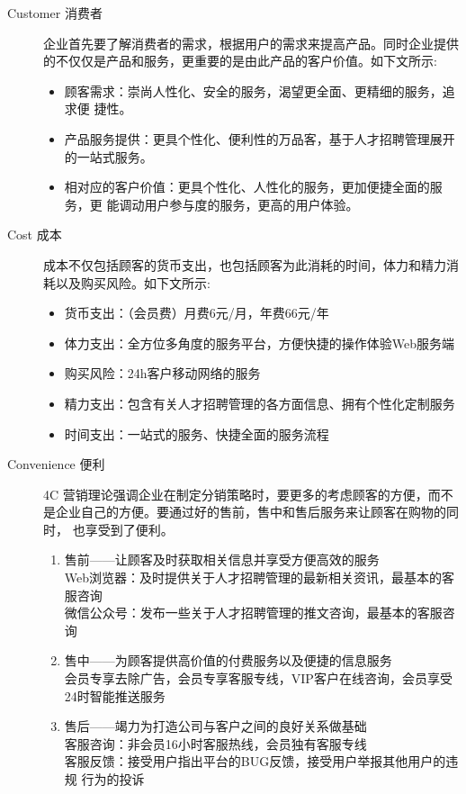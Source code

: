 \documentclass[master]{hduthesis}
\begin{document}
\begin{description}
	\item [Customer 消费者]
	      企业首先要了解消费者的需求，根据用户的需求来提高产品。同时企业提供 的不仅仅是产品和服务，更重要的是由此产品的客户价值。如下文所示:
	      \begin{itemize}
		      \item 顾客需求：崇尚人性化、安全的服务，渴望更全面、更精细的服务，追求便 捷性。
		      \item 产品服务提供：更具个性化、便利性的万品客，基于人才招聘管理展开的一站式服务。
		      \item 相对应的客户价值：更具个性化、人性化的服务，更加便捷全面的服务，更 能调动用户参与度的服务，更高的用户体验。
	      \end{itemize}
	\item[Cost 成本]
		成本不仅包括顾客的货币支出，也包括顾客为此消耗的时间，体力和精力消 耗以及购买风险。如下文所示:
		\begin{itemize}
			\item 货币支出：（会员费）月费6元/月，年费66元/年
			\item 体力支出：全方位多角度的服务平台，方便快捷的操作体验Web服务端
			\item 购买风险：24h客户移动网络的服务
			\item 精力支出：包含有关人才招聘管理的各方面信息、拥有个性化定制服务
			\item 时间支出：一站式的服务、快捷全面的服务流程
		\end{itemize}
		\item[Convenience 便利]4C 营销理论强调企业在制定分销策略时，要更多的考虑顾客的方便，而不 是企业自己的方便。要通过好的售前，售中和售后服务来让顾客在购物的同时， 也享受到了便利。
		\begin{enumerate}[1)]
			\item 售前——让顾客及时获取相关信息并享受方便高效的服务 \\Web浏览器：及时提供关于人才招聘管理的最新相关资讯，最基本的客服咨询
			      \\微信公众号：发布一些关于人才招聘管理的推文咨询，最基本的客服咨询
			\item 售中——为顾客提供高价值的付费服务以及便捷的信息服务 \\会员专享去除广告，会员专享客服专线，VIP客户在线咨询，会员享受24时智能推送服务
			\item 售后——竭力为打造公司与客户之间的良好关系做基础
			      \\客服咨询：非会员16小时客服热线，会员独有客服专线
			      \\客服反馈：接受用户指出平台的BUG反馈，接受用户举报其他用户的违规 行为的投诉

\end{enumerate}
\end{description}
\end{document}
